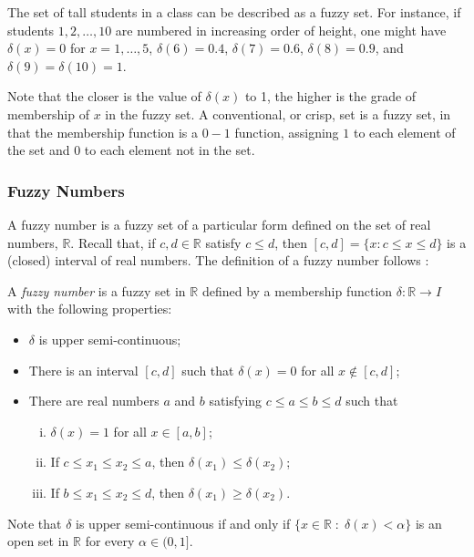 \begin{example}
\rm The set of tall students in a class can be described as a fuzzy set. For instance, if students $1, 2, \ldots, 10$ are numbered in increasing order of height, one might have $\delta(x) = 0$ for $x = 1, \ldots, 5$, $\delta(6) = 0.4$, $\delta(7) = 0.6$, $\delta(8) = 0.9$, and $\delta(9) = \delta(10) = 1$.
\end{example}

Note that the closer is the value of $\delta(x)$ to 1, the higher is the grade of membership of $x$ in the fuzzy set. A conventional, or crisp, set is a fuzzy set, in that the membership function is a $0-1$ function, assigning $1$ to each element of the set and $0$ to each element not in the set.

\subsubsection{Fuzzy Numbers}

A fuzzy number is a fuzzy set of a particular form defined on the set of real numbers, $\mathbb{R}$. Recall that, if $c, d \in \mathbb{R}$ satisfy $c \leq d$, then $[c, d] = \{x: c \leq x \leq d\}$ is a (closed) interval of real numbers. The definition of a fuzzy number follows \citep{Goetschel&Voxman86, Klir&Yuan95}:

\begin{definition}\label{def-fn}
\rm A \emph{fuzzy number} is a fuzzy set in $\mathbb{R}$ defined by a membership function $\delta : \mathbb{R} \longrightarrow I$ with the following properties:
\begin{itemize}
\item $\delta$ is upper semi-continuous;
\item There is an interval $[c, d]$ such that $\delta(x)=0$ for all $x \not \in [c, d]$;
\item There are real numbers $a$ and $b$ satisfying $c \leq a \leq b \leq d$ such that
\begin{enumerate}[(i)]
\item $\delta(x) = 1$ for all $x \in [a, b]$;
\item If $c \leq x_1 \leq x_2 \leq a$, then $\delta(x_1) \leq \delta(x_2)$;
\item If $b \leq x_1 \leq x_2 \leq d$, then $\delta(x_1) \geq \delta(x_2)$.
\end{enumerate}
\end{itemize}
\end{definition}
\noindent Note that $\delta$ is upper semi-continuous if and only if $\{x \in \mathbb{R} \; : \; \delta(x)<\alpha\}$ is an open set in $\mathbb{R}$ for every $\alpha \in (0, 1]$.

